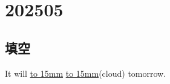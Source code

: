 \section{202505}

\subsection{填空}
\item{
    It will \underline{\hbox to 15mm{}} \underline{\hbox to 15mm{}}(cloud) tomorrow.
    \\
}